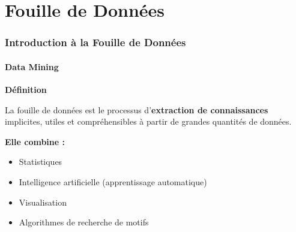\section{Fouille de Données}

\begin{frame}
\frametitle{Introduction à la Fouille de Données}
\framesubtitle{Data Mining}

\textbf{Définition}

\vspace{0.3cm}

La fouille de données est le processus d'\textbf{extraction de connaissances} implicites, utiles et compréhensibles à partir de grandes quantités de données.

\vspace{0.3cm}

\textbf{Elle combine :}
\begin{itemize}
    \item Statistiques
    \item Intelligence artificielle (apprentissage automatique)
    \item Visualisation
    \item Algorithmes de recherche de motifs
\end{itemize}

\end{frame}

